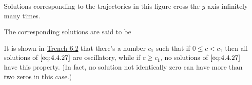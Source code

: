 \documentclass{ximera}
\begin{document}
\begin{center}
\end{center}
 
 
Solutions corresponding to the trajectories in
this figure cross the $y$-axis infinitely many times.



 
 
The corresponding solutions %
are said to be 
 
\begin{center}
\end{center}
 
 
It is shown in \href{https://ximera.osu.edu/ode/main/springProblemsII/springProblemsII}{Trench 6.2} that there's a number $c_1$ such that if $0\leq
c<c_1$ then  all solutions of $\eqref{eq:4.4.27}$ are oscillatory, while if
$c\geq c_1$,  no solutions of $\eqref{eq:4.4.27}$ have this property. (In
fact, no solution not identically zero can have more than two zeros in
this case.) 
 
 
\end{document}
